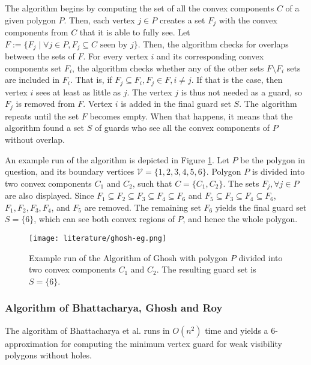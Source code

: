 The algorithm begins by computing the set of all the convex components $C$ of a given polygon $P$. Then, each vertex $j \in P$ creates a set $F_j$ with the convex components from $C$ that it is able to fully see. Let $F := \{F_j \mid \forall j \in P, F_j \subseteq C \text{ seen by } j\}$. Then, the algorithm checks for overlaps between the sets of $F$. For every vertex $i$ and its corresponding convex components set $F_i$, the algorithm checks whether any of the other sets $F \setminus F_i$ sets are included in $F_i$. That is, if $F_j \subseteq F_i, F_j \in F, i \neq j$. If that is the case, then  vertex $i$ sees at least as little as $j$. The vertex $j$ is thus not needed as a guard, so $F_j$ is removed from $F$. Vertex $i$ is added in the final guard set $S$. The algorithm repeats until the set $F$ becomes empty. When that happens, it means that the algorithm found a set $S$ of guards who see all the convex components of $P$ without overlap.


An example run of the algorithm is depicted in Figure \ref{fig:ghosh}. Let $P$ be the polygon in question, and its boundary vertices $\mathcal V = \{1, 2, 3, 4, 5, 6\}$. Polygon $P$ is divided into two convex components $C_1$ and $C_2$, such that $C = \{C_1, C_2\}$. The sets $F_j, \forall j \in P$ are also displayed. Since $F_1 \subseteq F_2 \subseteq F_3 \subseteq F_4 \subseteq F_6$ and $F_5 \subseteq F_3 \subseteq F_4 \subseteq F_6$, $F_1, F_2, F_3, F_4$, and $F_5$ are removed. The remaining set $F_6$ yields the final guard set $S = \{6\}$, which can see both convex regions of $P$, and hence the whole polygon.

\begin{figure}[h!]
    \centering
    \texttt{[image: literature/ghosh-eg.png]}
    \caption{Example run of the Algorithm of Ghosh \cite{GHOSH2010718} with polygon $P$ divided into two convex components $C_1$ and $C_2$. The resulting guard set is $S = \{6\}$.}
    \label{fig:ghosh}
\end{figure}

\newpage
\subsubsection{Algorithm of Bhattacharya, Ghosh and Roy}
The algorithm of Bhattacharya et al. \cite{bhattacharya2016approximability} runs in $O(n^2)$ time and yields a 6-approximation for computing the minimum vertex guard for weak visibility polygons without holes. 

